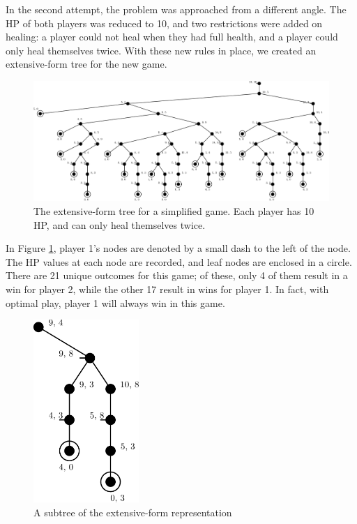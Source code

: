 In the second attempt, the problem was approached from a different angle. The HP of both players was reduced to 10, and two restrictions were added on healing: a player could not heal when they had full health, and a player could only heal themselves twice. With these new rules in place, we created an extensive-form tree for the new game.\\

\begin{figure}[H]
  \centering
  \includegraphics[width=15cm]{figures/GameTree.png}
  \caption{The extensive-form tree for a simplified game. Each player has 10 HP, and can only heal themselves twice.}
  \label{fig:gameTree}
\end{figure}

In Figure \ref{fig:gameTree}, player 1's nodes are denoted by a small dash to the left of the node. The HP values at each node are recorded, and leaf nodes are enclosed in a circle. There are 21 unique outcomes for this game; of these, only 4 of them result in a win for player 2, while the other 17 result in wins for player 1. In fact, with optimal play, player 1 will always win in this game.\\

\begin{figure}[H]
  \centering
  \includegraphics[width=4cm]{figures/GameSubtree.png}
  \caption{A subtree of the extensive-form representation}
  \label{fig:gameSubtree}
\end{figure}

